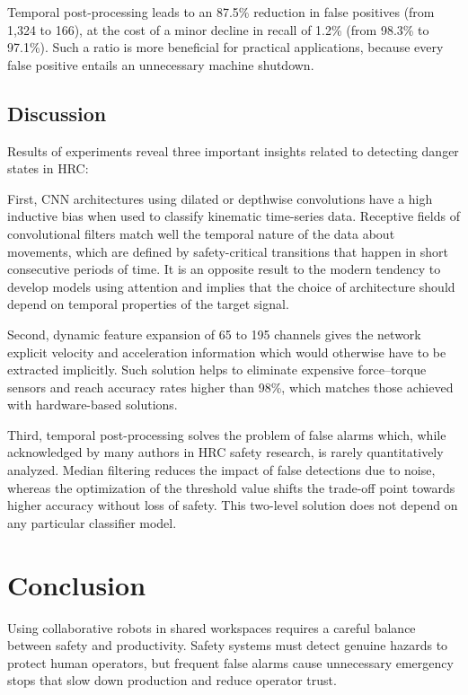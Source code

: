 \documentclass[3p,times,procedia]{elsarticle}
\begin{document}
Temporal post-processing leads to an 87.5\% reduction in false positives (from 1,324 to 166), at the cost of a minor decline in recall of 1.2\% (from 98.3\% to 97.1\%). Such a ratio is more beneficial for practical applications, because every false positive entails an unnecessary machine shutdown.
\subsection{Discussion}

Results of experiments reveal three important insights related to detecting danger states in HRC:

First, CNN architectures using dilated or depthwise convolutions have a high inductive bias when used to classify kinematic time-series data. Receptive fields of convolutional filters match well the temporal nature of the data about movements, which are defined by safety-critical transitions that happen in short consecutive periods of time. It is an opposite result to the modern tendency to develop models using attention and implies that the choice of architecture should depend on temporal properties of the target signal.

Second, dynamic feature expansion of 65 to 195 channels gives the network explicit velocity and acceleration information which would otherwise have to be extracted implicitly. Such solution helps to eliminate expensive force–torque sensors and reach accuracy rates higher than 98\%, which matches those achieved with hardware-based solutions.

Third, temporal post-processing solves the problem of false alarms which, while acknowledged by many authors in HRC safety research, is rarely quantitatively analyzed. Median filtering reduces the impact of false detections due to noise, whereas the optimization of the threshold value shifts the trade-off point towards higher accuracy without loss of safety. This two-level solution does not depend on any particular classifier model.
\section{Conclusion}
\label{sec:conclusion}

Using collaborative robots in shared workspaces requires a careful balance between safety and productivity. Safety systems must detect genuine hazards to protect human operators, but frequent false alarms cause unnecessary emergency stops that slow down production and reduce operator trust.
\end{document}
